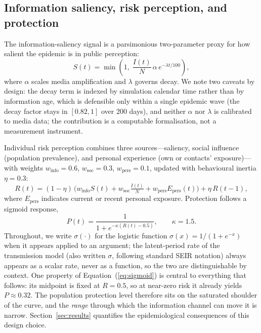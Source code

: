 \documentclass[]{interact}
\begin{document}
\subsection{Information saliency, risk perception, and protection}

The information-saliency signal is a parsimonious two-parameter proxy for how salient the epidemic is in public perception:
\begin{equation}
S(t) = \min\!\left(1,\; \frac{I(t)}{N}\,\alpha\, e^{-\lambda t/100}\right),
\label{eq:saliency}
\end{equation}
where $\alpha$ scales media amplification and $\lambda$ governs decay. We note two caveats by design: the decay term is indexed by simulation calendar time rather than by information age, which is defensible only within a single epidemic wave (the decay factor stays in $[0.82,1]$ over 200 days), and neither $\alpha$ nor $\lambda$ is calibrated to media data; the contribution is a computable formalisation, not a measurement instrument.

Individual risk perception combines three sources---saliency, social influence (population prevalence), and personal experience (own or contacts' exposure)---with weights $w_{\mathrm{info}}{=}0.6$, $w_{\mathrm{soc}}{=}0.3$, $w_{\mathrm{pers}}{=}0.1$, updated with behavioural inertia $\eta{=}0.3$:
\begin{equation}
R(t) = (1-\eta)\,\big(w_{\mathrm{info}} S(t) + w_{\mathrm{soc}} \tfrac{I(t)}{N} + w_{\mathrm{pers}} E_{\mathrm{pers}}(t)\big) + \eta\, R(t{-}1),
\end{equation}
where $E_{\mathrm{pers}}$ indicates current or recent personal exposure. Protection follows a sigmoid response,
\begin{equation}
P(t) = \frac{1}{1+e^{-\kappa (R(t)-0.5)}}, \qquad \kappa = 1.5.
\label{eq:sigmoid}
\end{equation}
Throughout, we write $\sigma(\cdot)$ for the logistic function $\sigma(x)=1/(1+e^{-x})$ when it appears applied to an argument; the latent-period rate of the transmission model (also written $\sigma$, following standard SEIR notation) always appears as a scalar rate, never as a function, so the two are distinguishable by context.
One property of Equation~(\ref{eq:sigmoid}) is central to everything that follows: its midpoint is fixed at $R{=}0.5$, so at near-zero risk it already yields $P\approx 0.32$. The population protection level therefore sits on the saturated shoulder of the curve, and the \emph{range} through which the information channel can move it is narrow. Section~\ref{sec:results} quantifies the epidemiological consequences of this design choice.
\end{document}
